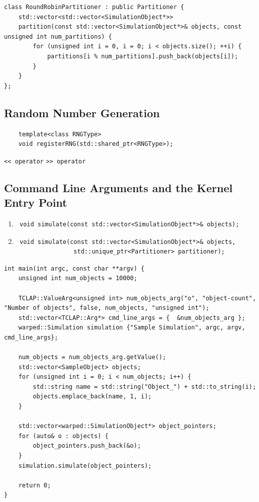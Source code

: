 \documentclass[11pt]{book}
\begin{document}
\begin{lstlisting}[caption=Sample \textsc{warped2} Partitioner Definition, label=partitioner_sample, float]
class RoundRobinPartitioner : public Partitioner {
    std::vector<std::vector<SimulationObject*>>
    partition(const std::vector<SimulationObject*>& objects, const unsigned int num_partitions) {
        for (unsigned int i = 0, i = 0; i < objects.size(); ++i) {
            partitions[i % num_partitions].push_back(objects[i]);
        }
    }
};
\end{lstlisting}

\subsection{Random Number Generation}

{\center
\begin{verbatim}
    template<class RNGType>
    void registerRNG(std::shared_ptr<RNGType>);
\end{verbatim}}

\texttt{<< operator}
\texttt{>> operator}

\subsection{Command Line Arguments and the Kernel Entry Point}

\begin{enumerate}

    \item \begin{verbatim} void simulate(const std::vector<SimulationObject*>& objects); \end{verbatim}
    \item \begin{verbatim} void simulate(const std::vector<SimulationObject*>& objects,
                std::unique_ptr<Partitioner> partitioner); \end{verbatim}

\end{enumerate}

\begin{lstlisting}[caption=Sample \textsc{warped2} Main Definition, label=main_sample, float]
int main(int argc, const char **argv) {
    unsigned int num_objects = 10000;

    TCLAP::ValueArg<unsigned int> num_objects_arg("o", "object-count", "Number of objects", false, num_objects, "unsigned int");
    std::vector<TCLAP::Arg*> cmd_line_args = {  &num_objects_arg };
    warped::Simulation simulation {"Sample Simulation", argc, argv, cmd_line_args};

    num_objects = num_objects_arg.getValue();
    std::vector<SampleObject> objects;
    for (unsigned int i = 0; i < num_objects; i++) {
        std::string name = std::string("Object_") + std::to_string(i);
        objects.emplace_back(name, 1, i);
    }

    std::vector<warped::SimulationObject*> object_pointers;
    for (auto& o : objects) {
        object_pointers.push_back(&o);
    }
    simulation.simulate(object_pointers);

    return 0;
}
\end{lstlisting}
\end{document}
